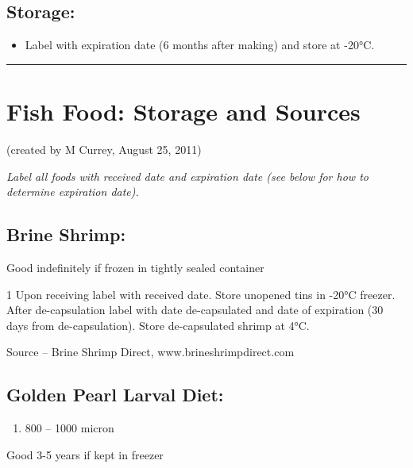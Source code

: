 \documentclass[
]{book}
\providecommand{\tightlist}{%
  \setlength{\itemsep}{0pt}\setlength{\parskip}{0pt}}
\begin{document}
\hypertarget{storage}{%
\subsection{Storage:}\label{storage}}

\begin{itemize}
\tightlist
\item
  Label with expiration date (6 months after making) and store at -20°C.
\end{itemize}

\begin{center}\rule{0.5\linewidth}{0.5pt}\end{center}

\hypertarget{fish-food-storage-and-sources}{%
\section{Fish Food: Storage and Sources}\label{fish-food-storage-and-sources}}

(created by M Currey, August 25, 2011)

\emph{Label all foods with received date and expiration date
(see below for how to determine expiration date).}

\hypertarget{brine-shrimp}{%
\subsection{Brine Shrimp:}\label{brine-shrimp}}

Good indefinitely if frozen in tightly sealed container

1 Upon receiving label with received date.
Store unopened tins in -20°C freezer.
After de-capsulation label with date de-capsulated and date of expiration (30 days from de-capsulation).
Store de-capsulated shrimp at 4°C.

Source -- Brine Shrimp Direct, www.brineshrimpdirect.com

\hypertarget{golden-pearl-larval-diet}{%
\subsection{Golden Pearl Larval Diet:}\label{golden-pearl-larval-diet}}

\begin{enumerate}
\def\labelenumi{\arabic{enumi}.}
\tightlist
\item
  800 -- 1000 micron
\end{enumerate}

Good 3-5 years if kept in freezer
\end{document}

